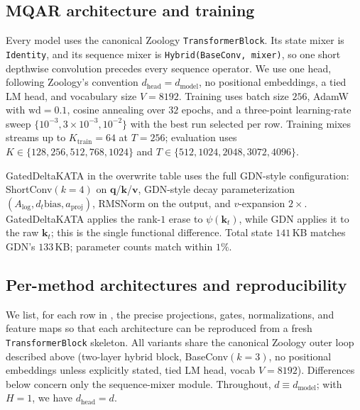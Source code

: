 \documentclass{article}
\newcommand{\1}{\bm{1}}
\def\vk{{\bm{k}}}
\def\vq{{\bm{q}}}
\def\vv{{\bm{v}}}
\newcommand{\seql}{T}
\theoremstyle{definition}
\begin{document}
\subsection{MQAR architecture and training}

Every model uses the canonical Zoology \texttt{TransformerBlock}. Its state mixer is
\texttt{Identity}, and its sequence mixer is \texttt{Hybrid(BaseConv, mixer)}, so one short
depthwise convolution precedes every sequence operator. We use one head, following Zoology's
convention $d_\text{head}=d_\text{model}$, no positional embeddings, a tied LM head, and vocabulary
size $V=8192$. Training uses batch size $256$, AdamW with $\mathrm{wd}=0.1$, cosine annealing over
$32$ epochs, and a three-point learning-rate sweep
$\{10^{-3},3\!\times\!10^{-3},10^{-2}\}$ with the best run selected per row. Training mixes streams
up to $K_\text{train}=64$ at $\seql=256$; evaluation uses
$K\in\{128,256,512,768,1024\}$ and $\seql\in\{512,1024,2048,3072,4096\}$.

GatedDeltaKATA in the overwrite table uses the full GDN-style configuration: ShortConv$(k{=}4)$ on
$\vq$/$\vk$/$\vv$, GDN-style decay parameterization $(A_\text{log},d_t\text{bias},a_\text{proj})$,
$\mathrm{RMSNorm}$ on the output, and $v$-expansion $2\times$. GatedDeltaKATA applies the
rank-$1$ erase to $\psi(\vk_t)$, while GDN applies it to the raw $\vk_t$; this is the single
functional difference.
Total state $141$\,KB matches GDN's $133$\,KB; parameter counts match within $1\%$.

\subsection{Per-method architectures and reproducibility}
\label{app:mechanism-archs}

We list, for each row in , the precise
projections, gates, normalizations, and feature maps so that each architecture can be reproduced
from a fresh \texttt{TransformerBlock} skeleton. All variants share the canonical Zoology outer
loop described above (two-layer hybrid block, BaseConv$(k{=}3)$, no positional embeddings unless
explicitly stated, tied LM head, vocab $V{=}8192$). Differences below concern only the
sequence-mixer module. Throughout, $d\equiv d_\text{model}$; with $H=1$, we have $d_\text{head}=d$.
\end{document}
